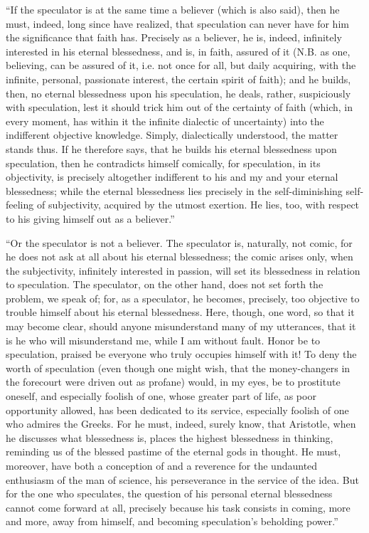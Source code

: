 \documentclass[12pt]{book}
\begin{document}
``If the speculator is at the same time a believer (which is also said), then he must, indeed, long since have realized, that speculation can never have for him the significance that faith has. Precisely as a believer, he is, indeed, infinitely interested in his eternal blessedness, and is, in faith, assured of it (N.B. as one, believing, can be assured of it, i.e. not once for all, but daily acquiring, with the infinite, personal, passionate interest, the certain spirit of faith); and he builds, then, no eternal blessedness upon his speculation, he deals, rather, suspiciously with speculation, lest it should trick him out of the certainty of faith (which, in every moment, has within it the infinite dialectic of uncertainty) into the indifferent objective knowledge. Simply, dialectically understood, the matter stands
thus. If he therefore says, that he builds his eternal blessedness upon speculation, then he contradicts himself comically, for speculation, in its objectivity, is precisely altogether indifferent to his and my and your eternal blessedness; while the eternal blessedness lies precisely in the self-diminishing self-feeling of subjectivity, acquired by the utmost exertion. He lies, too, with respect to his giving himself out as a believer.''

``Or the speculator is not a believer. The speculator is, naturally, not comic, for he does not ask at all about his eternal blessedness; the comic arises only, when the subjectivity, infinitely interested in passion, will set its blessedness in relation to speculation. The speculator, on the other hand, does not set forth the problem, we speak of; for, as a speculator, he becomes, precisely, too objective to trouble himself about his eternal blessedness. Here, though, one word, so that it may become clear, should anyone misunderstand many of my utterances, that it is he who will misunderstand me, while I am without fault. Honor be to speculation, praised be everyone who truly occupies himself with it! To deny the worth of speculation (even though one might wish, that the money-changers in the forecourt were driven out as profane) would, in my eyes, be to prostitute oneself, and especially foolish of one, whose greater part of life, as poor opportunity allowed, has been dedicated to its service, especially foolish of one who admires the Greeks. For he must, indeed, surely know, that Aristotle, when he discusses what blessedness is, places the highest blessedness in
thinking, reminding us of the blessed pastime of the eternal gods in thought. He must, moreover, have both a conception of and a reverence for the undaunted enthusiasm of the man of science, his perseverance in the service of the idea. But for the one who speculates, the question of his personal eternal blessedness cannot come forward at all, precisely because his task consists in coming, more and more, away from himself, and becoming speculation's beholding power.''
\end{document}
